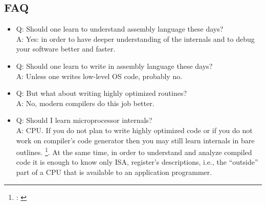 \subsection*{\ac{FAQ}}

\newcommand{\FNURLREDDIT}{\footnote{\url{http://www.reddit.com/r/ReverseEngineering/}}}

\begin{itemize}
\item
Q: 
{Should one learn to understand assembly language these days?} \\
A: 
{Yes: in order to have deeper understanding of the internals and to debug your software better and faster.}

\item
Q: 
{Should one learn to write in assembly language these days?} \\
A: 
{Unless one writes low-level \ac{OS} code, probably no.}

\item
Q: 
{But what about writing highly optimized routines?} \\
A: 
{No, modern \CCpp compilers do this job better.}

\item
Q: 
{Should I learn microprocessor internals}? \\
A:  \ac{CPU}.
{If you do not plan to write highly optimized code or if you do not work on compiler's code generator
then you may still learn internals in bare outlines.}
\footnote{: \cite{AgnerFog}}.
{At the same time, in order to understand and analyze compiled code it is enough to know
only \ac{ISA}, register's descriptions, i.e., the ``outside'' part of a \ac{CPU} that is available to
an application programmer}.


\end{itemize}
